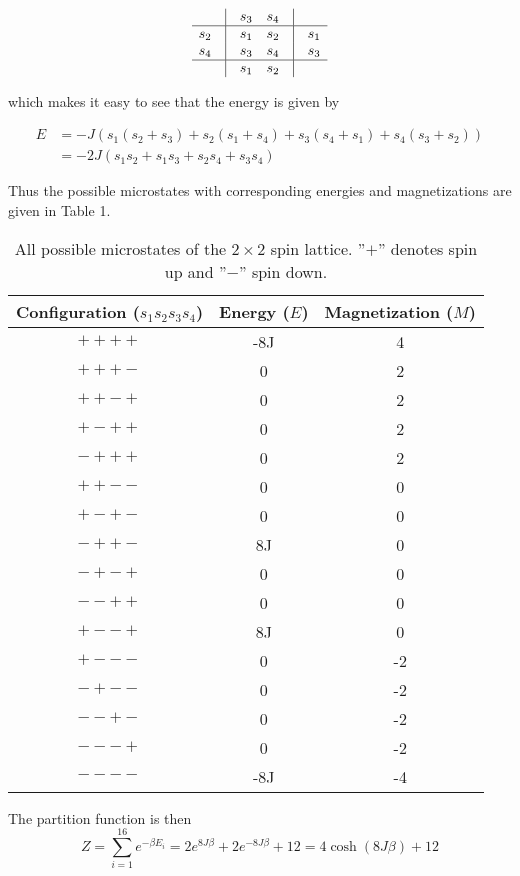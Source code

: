 \documentclass[english, 12pt]{article}
\begin{document}
$$\begin{matrix} & \vline & s_3  & s_4 & \vline & \\ \hline
s_2 & \vline & s_1 & s_2 & \vline & s_1 \\
s_4 & \vline & s_3 & s_4 & \vline & s_3 \\ \hline
 & \vline & s_1 & s_2 & \vline & \end{matrix} $$

which makes it easy to see that the energy is given by

\begin{align*}
E &= -J(s_1(s_2+s_3) + s_2(s_1+s_4) + s_3(s_4+s_1) + s_4(s_3+s_2))\\
&= -2J(s_1s_2 + s_1s_3+s_2s_4+s_3s_4)
\end{align*}

Thus the possible microstates with corresponding energies and magnetizations are given in Table 1.

\begin{table}[hbt!]
\centering
\begin{tabular}{|c|c|c|}
 Configuration ($s_1s_2s_3s_4$) & Energy ($E$) & Magnetization ($M$) \\ \hline
$++++$ & -8J & 4 \\
$+++-$ & 0 & 2 \\
$++-+$ & 0 & 2 \\
$+-++$ & 0 & 2 \\
$-+++$ & 0 & 2 \\
$++--$ & 0 & 0 \\
$+-+-$ & 0 & 0 \\
$-++-$ & 8J & 0 \\
$-+-+$ & 0 & 0 \\
$--++$ & 0 & 0 \\
$+--+$ & 8J & 0 \\
$+---$ & 0 & -2 \\
$-+--$ & 0 & -2 \\
$--+-$ & 0 & -2 \\
$---+$ & 0 & -2 \\
$----$ & -8J & -4 \\
\end{tabular}
\caption{All possible microstates of the $2\times2$ spin lattice. ''$+$'' denotes spin up and ''$-$'' spin down.}
\end{table}

The partition function is then 
$$Z = \sum\limits_{i=1}^{16}e^{-\beta E_i} = 2e^{8J\beta} +2e^{-8J\beta}+12
= 4\cosh(8J\beta) +12$$
\end{document}
